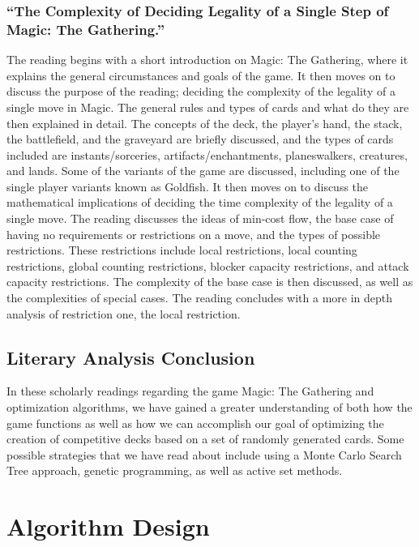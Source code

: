 \documentclass[12pt, letterpaper]{article}
\begin{document}
\subsubsection{\enquote{The Complexity of Deciding Legality of a Single Step of Magic: The Gathering.}}

The reading begins with a short introduction on Magic: The Gathering,
where it explains the general circumstances and goals of the game.
It then moves on to discuss the purpose of the reading;
deciding the complexity of the legality of a single move in Magic.
The general rules and types of cards and what do they are then explained in detail.
The concepts of the deck, the player’s hand, the stack, the battlefield,
and the graveyard are briefly discussed, and the types of cards included are instants/sorceries,
artifacts/enchantments, planeswalkers, creatures, and lands.
Some of the variants of the game are discussed,
including one of the single player variants known as Goldfish.
It then moves on to discuss the mathematical implications of
deciding the time complexity of the legality of a single move.
The reading discusses the ideas of min-cost flow,
the base case of having no requirements or restrictions on a move,
and the types of possible restrictions.
These restrictions include local restrictions, local counting restrictions,
global counting restrictions, blocker capacity restrictions, and attack capacity restrictions.
The complexity of the base case is then discussed,
as well as the complexities of special cases.
The reading concludes with a more in depth analysis of restriction one, the local restriction.

\subsection{Literary Analysis Conclusion}

In these scholarly readings regarding the game Magic: The Gathering and optimization algorithms, we have gained a
greater understanding of both how the game functions as well as how we can accomplish our goal of optimizing the creation
of competitive decks based on a set of randomly generated cards. Some possible strategies that we have read about include
using a Monte Carlo Search Tree approach, genetic programming, as well as active set methods.

\section{Algorithm Design}
\end{document}
